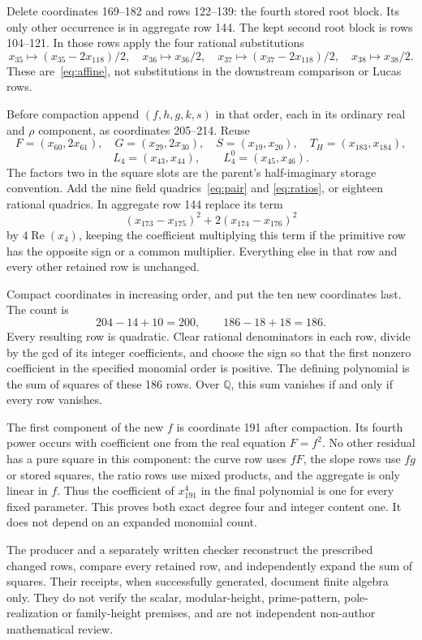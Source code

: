 \documentclass[11pt,a4paper]{article}
\newcommand{\Q}{\mathbb Q}\newcommand{\Z}{\mathbb Z}\DeclareMathOperator{\Tr}{Tr}
\begin{document}
Delete coordinates 169--182 and rows 122--139: the fourth stored root block.
Its only other occurrence is in aggregate row 144. The kept second root
block is rows 104--121. In those rows apply the four rational substitutions
\[
 x_{35}\mapsto(x_{35}-2x_{118})/2,\quad x_{36}\mapsto x_{36}/2,
 \quad x_{37}\mapsto(x_{37}-2x_{118})/2,\quad x_{38}\mapsto x_{38}/2.
\]
These are~\eqref{eq:affine}, not substitutions in the downstream comparison
or Lucas rows.

Before compaction append $(f,h,g,k,s)$ in that order, each in its ordinary
real and $\rho$ component, as coordinates 205--214. Reuse
\[
 F=(x_{60},2x_{61}),\quad G=(x_{29},2x_{30}),\quad
 S=(x_{19},x_{20}),\quad T_H=(x_{183},x_{184}),
\]
\[
 L_4=(x_{43},x_{44}),\qquad L_4^0=(x_{45},x_{46}).
\]
The factors two in the square slots are the parent's half-imaginary
storage convention. Add the nine field quadrics~\eqref{eq:pair} and
\eqref{eq:ratios}, or eighteen rational quadrics.
In aggregate row 144 replace its term
\[
 (x_{173}-x_{175})^2+2(x_{174}-x_{176})^2
\]
by $4\operatorname{Re}(x_4)$, keeping the coefficient multiplying this
term if the primitive row has the opposite sign or a common multiplier.
Everything else in that row and every other retained row is unchanged.

Compact coordinates in increasing order, and put the ten new coordinates
last. The count is
\[
                    204-14+10=200,\qquad 186-18+18=186.
\]
Every resulting row is quadratic. Clear rational denominators in each row,
divide by the gcd of its integer coefficients, and choose the sign so that
the first nonzero coefficient in the specified monomial order is positive.
The defining polynomial is the sum of squares of these 186 rows.
Over $\Q$, this sum vanishes if and only if every row vanishes.

The first component of the new $f$ is coordinate 191 after compaction.
Its fourth power occurs with coefficient one from the real equation
$F=f^2$. No other residual has a pure square in this component: the curve
row uses $fF$, the slope rows use $fg$ or stored squares, the ratio rows
use mixed products, and the aggregate is only linear in $f$. Thus the
coefficient of $x_{191}^4$ in the final polynomial is one for every fixed
parameter. This proves both exact degree four and integer content one.
It does not depend on an expanded monomial count.

The producer and a separately written checker reconstruct the prescribed
changed rows, compare every retained row, and independently expand the
sum of squares. Their receipts, when successfully generated, document
finite algebra only. They do not verify the scalar, modular-height,
prime-pattern, pole-realization or family-height premises, and are not
independent non-author mathematical review.
\end{document}
